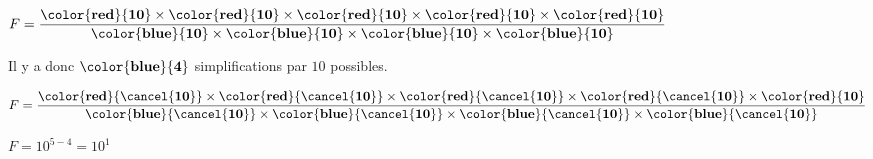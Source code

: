 \begin{corrige}
\begin{enumerate}
            \medskip
            $F=\dfrac{\mathbf{\color{red}{10}} \times \mathbf{\color{red}{10}}\times \mathbf{\color{red}{10}}\times \mathbf{\color{red}{10}}\times \mathbf{\color{red}{10}}}{\mathbf{\color{blue}{10}} \times \mathbf{\color{blue}{10}}\times \mathbf{\color{blue}{10}}\times \mathbf{\color{blue}{10}}}$
            
            \medskip
            Il y a donc $\mathbf{\color{blue}{4}}$ simplifications par $10$ possibles.
            
            \medskip
            $F=\dfrac{\mathbf{\color{red}{\cancel{10}}} \times \mathbf{\color{red}{\cancel{10}}}\times \mathbf{\color{red}{\cancel{10}}}\times \mathbf{\color{red}{\cancel{10}}}\times\mathbf{\color{red}{10}}}{\mathbf{\color{blue}{\cancel{10}}} \times \mathbf{\color{blue}{\cancel{10}}}\times \mathbf{\color{blue}{\cancel{10}}}\times \mathbf{\color{blue}{\cancel{10}}}}$
            
            \medskip
            $F=10^{5-4}=10^{1}$        
    \end{enumerate}

\end{corrige}

